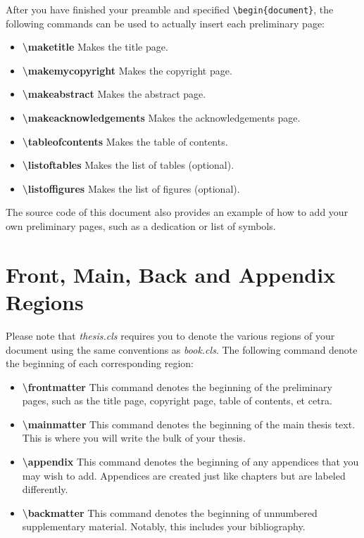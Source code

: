 \documentclass[master]{thesis}
\begin{document}
After you have finished your preamble and specified \verb|\begin{document}|, the following commands can be used to actually insert each preliminary page:

\begin{itemize}
    \item \textbf{\textbackslash maketitle}  Makes the title page.
    \item \textbf{\textbackslash makemycopyright}  Makes the copyright page.
    \item \textbf{\textbackslash makeabstract}  Makes the abstract page.
    \item \textbf{\textbackslash makeacknowledgements}  Makes the acknowledgements page.
    \item \textbf{\textbackslash tableofcontents}  Makes the table of contents.
    \item \textbf{\textbackslash listoftables}  Makes the list of tables (optional).
    \item \textbf{\textbackslash listoffigures}  Makes the list of figures (optional).
\end{itemize}

The source code of this document also provides an example of how to add your own preliminary pages, such as a dedication or list of symbols.

\section{Front, Main, Back and Appendix Regions}

Please note that \textit{thesis.cls} requires you to denote the various regions of your document using the same conventions as \textit{book.cls}.  The following command denote the beginning of each corresponding region:

\begin{itemize}
    \item \textbf{\textbackslash frontmatter}  This command denotes the beginning of the preliminary pages, such as the title page, copyright page, table of contents, et cetra.
    \item \textbf{\textbackslash mainmatter}  This command denotes the beginning of the main thesis text.  This is where you will write the bulk of your thesis.
    \item \textbf{\textbackslash appendix}  This command denotes the beginning of any appendices that you may wish to add.  Appendices are created just like chapters but are labeled differently.
    \item \textbf{\textbackslash backmatter}  This command denotes the beginning of unnumbered supplementary material.  Notably, this includes your bibliography.
\end{itemize}
\end{document}
